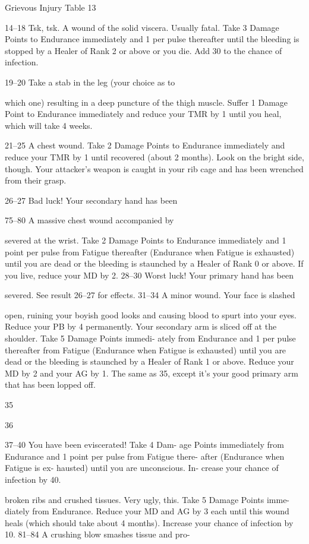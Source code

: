\begin{Chapter}{Grievous Injury Table}
13  

14–18   Tsk, tsk. A wound of the solid viscera. 
Usually fatal. Take 3 Damage Points to 
Endurance immediately and 1 per pulse 
thereafter until the bleeding is stopped by 
a Healer of Rank 2 or above or you die. 
Add 30 to the chance of infection. 

19–20   Take a stab in the leg (your choice as to 

which one) resulting in a deep puncture of 
the thigh muscle. Suffer 1 Damage Point 
to Endurance immediately and reduce 
your TMR by 1 until you heal, which will 
take 4 weeks. 

21–25   A chest wound. Take 2 Damage Points to 
Endurance immediately and reduce your 
TMR by 1 until recovered (about 2 
months). Look on the bright side, though. 
Your attacker’s weapon is caught in your 
rib cage and has been wrenched from 
their grasp. 

26–27   Bad luck! Your secondary hand has been 

75–80   A massive chest wound accompanied by 

severed at the wrist. Take 2 Damage 
Points to Endurance immediately and 1 
point per pulse from Fatigue thereafter 
(Endurance when Fatigue is exhausted) 
until you are dead or the bleeding is 
staunched by a Healer of Rank 0 or 
above. If you live, reduce your MD by 2. 
28–30   Worst luck! Your primary hand has been 

severed. See result 26–27 for effects. 
31–34   A minor wound. Your face is slashed 

open, ruining your boyish good looks and 
causing blood to spurt into your eyes. 
Reduce your PB by 4 permanently. 
Your secondary arm is sliced off at the 
shoulder. Take 5 Damage Points immedi-
ately from Endurance and 1 per pulse 
thereafter from Fatigue (Endurance when 
Fatigue is exhausted) until you are dead 
or the bleeding is staunched by a Healer 
of Rank 1 or above. Reduce your MD by 
2 and your AG by 1. 
The same as 35, except it’s your good 
primary arm that has been lopped off. 

35  

36  

37–40   You have been eviscerated! Take 4 Dam-
age Points immediately from Endurance 
and 1 point per pulse from Fatigue there-
after (Endurance when Fatigue is ex-
hausted) until you are unconscious. In-
crease your chance of infection by 40. 

broken ribs and crushed tissues. Very 
ugly, this. Take 5 Damage Points imme-
diately from Endurance. Reduce your MD 
and AG by 3 each until this wound heals 
(which should take about 4 months). 
Increase your chance of infection by 10. 
81–84   A crushing blow smashes tissue and pro-


\end{Chapter}
